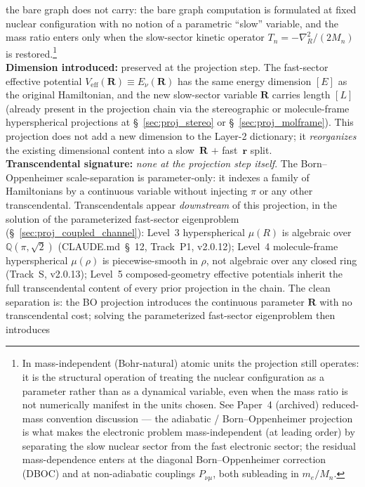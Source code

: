 the bare graph does not carry: the bare graph computation is
formulated at fixed nuclear configuration with no notion of a
parametric ``slow'' variable, and the mass ratio enters only when
the slow-sector kinetic operator $T_n = -\nabla_R^2 / (2 M_n)$ is
restored.\footnote{In mass-independent (Bohr-natural) atomic units
the projection still operates: it is the structural operation of
treating the nuclear configuration as a parameter rather than as a
dynamical variable, even when the mass ratio is not numerically
manifest in the units chosen.  See Paper~4 (archived) reduced-mass
convention discussion --- the adiabatic / Born--Oppenheimer
projection is what makes the electronic problem mass-independent
(at leading order) by separating the slow nuclear sector from the
fast electronic sector; the residual mass-dependence enters at the
diagonal Born--Oppenheimer correction (DBOC) and at non-adiabatic
couplings $P_{\nu\mu}$, both subleading in $m_e / M_n$.}\\
\textbf{Dimension introduced:} preserved at the projection step.  The
fast-sector effective potential $V_\text{eff}(\bm{R}) \equiv
E_\nu(\bm{R})$ has the same energy dimension $[E]$ as the original
Hamiltonian, and the new slow-sector variable $\bm{R}$ carries length
$[L]$ (already present in the projection chain via the stereographic
or molecule-frame hyperspherical projections at \S~\ref{sec:proj_stereo}
or \S~\ref{sec:proj_molframe}).  This projection does
not add a new dimension to the Layer-2 dictionary; it
\emph{reorganizes} the existing dimensional content into a slow~$\bm{R}$
$+$ fast~$\bm{r}$ split.\\
\textbf{Transcendental signature:} \textit{none at the projection step
itself}.  The Born--Oppenheimer scale-separation is parameter-only:
it indexes a family of Hamiltonians by a continuous variable without
injecting $\pi$ or any other transcendental.  Transcendentals appear
\emph{downstream} of this projection, in the solution of the
parameterized fast-sector eigenproblem
(\S~\ref{sec:proj_coupled_channel}): Level~3 hyperspherical $\mu(R)$
is
algebraic over $\mathbb{Q}(\pi, \sqrt{2})$ (CLAUDE.md~\S~12, Track~P1,
v2.0.12); Level~4 molecule-frame hyperspherical $\mu(\rho)$ is
piecewise-smooth in $\rho$, not algebraic over any closed ring
(Track~S, v2.0.13); Level~5 composed-geometry effective potentials
inherit the full transcendental content of every prior projection in
the chain.  The clean separation is: the BO projection introduces the
continuous parameter $\bm{R}$ with no transcendental cost; solving
the parameterized fast-sector eigenproblem then introduces
